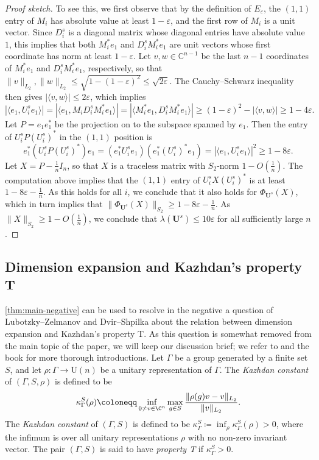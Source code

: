 \documentclass{toc}
\theoremstyle{plain}
\numberwithin{equation}{section}
\theoremstyle{definition}
\newcommand{\bC}{\mathbb{C}}
\newcommand{\norm}[1]{\lVert#1\rVert}
\newcommand{\ab}[1]{\left\lvert#1\right\rvert}
\newcommand{\U}{\mathrm{U}}
\newcommand{\tuple}[1]{\mathbf{#1}}
\newcommand{\vU}{\tuple{U}}
\begin{document}
\begin{proof}[Proof sketch]
To see this, we first observe that by the definition of $E_\varepsilon$, the $(1,1)$ entry of $M_i$ has absolute value at least $1- \varepsilon$, and the first row of $M_i$ is a unit vector. Since $D_i^s$ is a diagonal matrix whose diagonal entries have absolute value $1$, this implies that both $M_i^* e_1$ and $D_i^s M_i^* e_1$ are unit vectors whose first coordinate has norm at least $1- \varepsilon$. Let $v,w \in \bC^{n-1}$ be the last $n-1$ coordinates of $M_i^* e_1$ and $D_i^s M_i^* e_1$, respectively, so that $\norm v_{L_2},\norm w_{L_2} \leq \sqrt{1-(1- \varepsilon)^2} \leq \sqrt{2 \varepsilon}$.
The Cauchy--Schwarz inequality then gives $\ab{\langle v,w\rangle} \leq 2 \varepsilon$, which implies 
\[
    \ab{\langle e_1,U_i^s e_1\rangle} = \ab{\langle e_1, M_i D_i^s M_i^* e_1\rangle} = \ab{\langle M_i^* e_1, D_i^s M_i^* e_1\rangle} \geq (1- \varepsilon)^2 - \ab{\langle v,w\rangle}  \geq 1- 4 \varepsilon.
\]
Let $P = e_1e_1^*$ be the projection on to the subspace spanned by $e_1$. Then the entry of $U_i^s P (U_i^s)^*$ in the $(1,1)$ position is
\[
    e_1^* \left(U_i^s P (U_i^s)^*\right) e_1 = (e_1^* U_i^s e_1) (e_1^* (U_i^s)^* e_1) = \ab{\langle e_1,U_i^s e_1\rangle}^2 \geq 1- 8 \varepsilon.
\]
Let $X = P - \frac1 n I_n$, so that $X$ is a traceless matrix with $S_2$-norm $1-O(\frac 1n)$. The computation above implies that the $(1,1)$ entry of $U_i^s X (U_i^s)^*$ is at least $1-8 \varepsilon- \frac 1n$. As this holds for all $i$, we conclude that it also holds for $\Phi_{\vU^s}(X)$, which in turn implies that $\norm{\Phi_{\vU^s}(X)}_{S_2} \geq 1- 8 \varepsilon - \frac 1n$. As $\norm X_{S_2} \geq 1- O(\frac 1n)$, we conclude that $\lambda(\vU^s) \leq 10 \varepsilon$ for all sufficiently large $n$.
\end{proof}

\subsection{Dimension expansion and Kazhdan's property T}\label{sec:kazhdan}
\cref{thm:main-negative} can be used to resolve in the negative a question of Lubotzky--Zelmanov \cite{LUBOTZKY2008730} and Dvir--Shpilka \cite{DS09} about the relation between dimension expansion and Kazhdan's property T. As this question is somewhat removed from the main topic of the paper, we will keep our discussion brief; we refer to \cite{LUBOTZKY2008730,DS09} and the book \cite{Lubotzky_book} for more thorough introductions. Let $\Gamma$ be a group generated by a finite set $S$, and let $\rho:\Gamma \to \U(n)$ be a unitary representation of $\Gamma$. The \emph{Kazhdan constant} of $(\Gamma,S,\rho)$ is defined to be
\[
    \kappa_\Gamma^S(\rho) \coloneqq \inf_{0 \neq v \in \C^n} \max_{g \in S} \frac{\norm{\rho(g)v-v}_{L_2}}{\norm v_{L_2}}.
\]
The \emph{Kazhdan constant} of $(\Gamma,S)$ is defined to be $\kappa_\Gamma^S \coloneqq \inf_\rho \kappa_\Gamma^S(\rho)>0$, where the infimum is over all unitary representations $\rho$ with no non-zero invariant vector. The pair $(\Gamma,S)$ is said to have \emph{property T} if $\kappa_\Gamma^S>0$.
\end{document}
